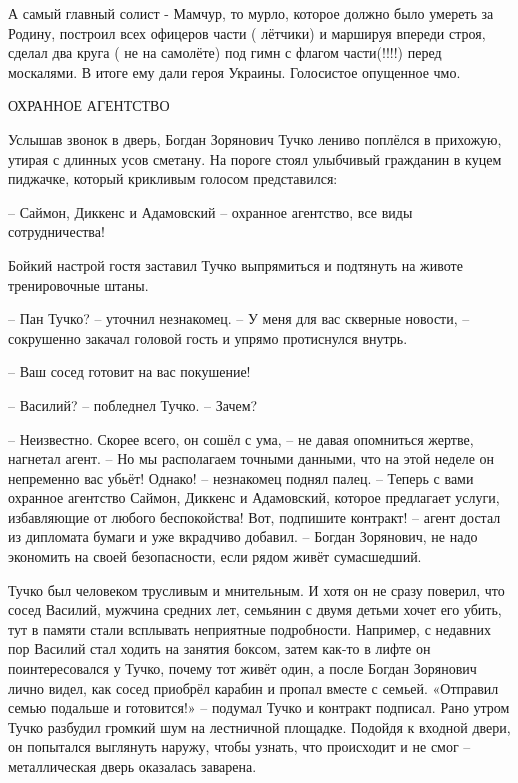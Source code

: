 \begin{itemize}

А самый главный солист - Мамчур, то мурло, которое должно было умереть за
Родину, построил всех офицеров части ( лётчики) и маршируя впереди строя,
сделал два круга ( не на самолёте) под гимн с флагом части(!!!!) перед
москалями. В итоге ему дали героя Украины. Голосистое опущенное чмо.


ОХРАННОЕ АГЕНТСТВО

Услышав звонок в дверь, Богдан Зорянович Тучко лениво поплёлся в прихожую,
утирая с длинных усов сметану. На пороге стоял улыбчивый гражданин в куцем
пиджачке, который крикливым голосом представился:

– Саймон, Диккенс и Адамовский – охранное агентство, все виды сотрудничества!

Бойкий настрой гостя заставил Тучко выпрямиться и подтянуть на животе
тренировочные штаны.

– Пан Тучко? – уточнил незнакомец. – У меня для вас скверные новости, –
сокрушенно закачал головой гость и упрямо протиснулся внутрь. 

– Ваш сосед готовит на вас покушение!

– Василий? – побледнел Тучко. – Зачем?

– Неизвестно. Скорее всего, он сошёл с ума, – не давая опомниться жертве,
нагнетал агент. – Но мы располагаем точными данными, что на этой неделе он
непременно вас убьёт! Однако! – незнакомец поднял палец. – Теперь с вами
охранное агентство Саймон, Диккенс и Адамовский, которое предлагает услуги,
избавляющие от любого беспокойства! Вот, подпишите контракт! – агент достал из
дипломата бумаги и уже вкрадчиво добавил. – Богдан Зорянович, не надо экономить
на своей безопасности, если рядом живёт сумасшедший.

Тучко был человеком трусливым и мнительным. И хотя он не сразу поверил, что
сосед Василий, мужчина средних лет, семьянин с двумя детьми хочет его убить,
тут в памяти стали всплывать неприятные подробности. Например, с недавних пор
Василий стал ходить на занятия боксом, затем как-то в лифте он поинтересовался
у Тучко, почему тот живёт один, а после Богдан Зорянович лично видел, как сосед
приобрёл карабин и пропал вместе с семьей. «Отправил семью подальше и
готовится!» – подумал Тучко и контракт подписал.  Рано утром Тучко разбудил
громкий шум на лестничной площадке. Подойдя к входной двери, он попытался
выглянуть наружу, чтобы узнать, что происходит и не смог – металлическая дверь
оказалась заварена.


\end{itemize}
